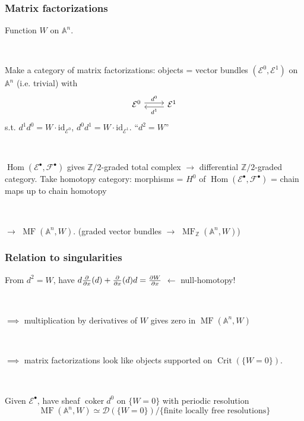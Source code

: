 \documentclass{beamer}
\DeclareMathOperator{\coker}{coker}
\DeclareMathOperator{\Hom}{Hom}
\DeclareMathOperator{\Crit}{Crit}
\DeclareMathOperator{\MF}{MF}
\newcommand{\A}{\mathbb{A}}
\newcommand{\Z}{\mathbb{Z}}
\newcommand{\calD}{\mathcal{D}}
\newcommand{\calE}{\mathcal{E}}
\newcommand{\calF}{\mathcal{F}}
\newcommand{\id}{\mathrm{id}}
\begin{document}
\begin{frame}
    \frametitle{Matrix factorizations}

    Function $W$ on $\A^n$. \pause

    ~

    Make a category of matrix factorizations: \pause objects = vector bundles
    $(\calE^0,\calE^1)$ on $\A^n$ (i.e. trivial) with
    \begin{equation*}
        \begin{tikzcd}[ampersand replacement=\&]
            \calE^0 \ar[r,shift left,"d^0"] \&
            \calE^1 \ar[l,shift left,"d^1"]
        \end{tikzcd}
    \end{equation*}
    s.t. $d^1d^0=W\cdot\id_{\calE^0}$, $d^0d^1 = W\cdot\id_{\calE^1}$.
    ``$d^2=W$'' \pause

    ~

    $\Hom(\calE^\bullet,\calF^\bullet)$ gives $\Z/2$-graded total complex
    $\to$ differential $\Z/2$-graded category. \pause Take homotopy category:
    morphisms = $H^0$ of $\Hom(\calE^\bullet,\calF^\bullet)$ = chain maps up to
    chain homotopy \pause

    ~

    $\to$ $\MF(\A^n,W)$. \pause (graded vector bundles $\to$ $\MF_\Z(\A^n,W)$)

\end{frame}

\begin{frame}
    \frametitle{Relation to singularities}

    From $d^2=W$, have $d\pdv{}{x}(d)+\pdv{}{x}(d)d=\pdv{W}{x}$
    \pause $\leftarrow$ null-homotopy! \pause

    ~

    $\implies$ multiplication by derivatives of $W$ gives zero in $\MF(\A^n,W)$
    \pause

    ~

    $\implies$ matrix factorizations look like objects supported on
    $\Crit(\{W=0\})$. \pause

    ~

    Given $\calE^\bullet$, have sheaf $\coker d^0$ on $\{W=0\}$ with periodic
    resolution \pause
    \begin{equation*}
        \MF(\A^n,W) \simeq \calD(\{W=0\})
            / \{\text{finite locally free resolutions}\}
    \end{equation*}
\end{frame}
\end{document}
